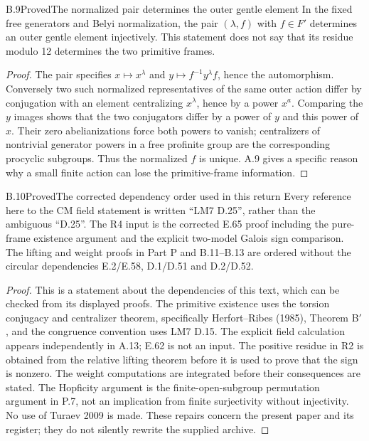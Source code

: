\begin{statement}{B.9}{Proved}{The normalized pair determines the outer gentle element}
In the fixed free generators and Belyi normalization,
the pair $(\lambda,f)$ with $f\in F'$ determines
an outer gentle element injectively. This statement
does not say that its residue modulo 12 determines
the two primitive frames.
\end{statement}
\begin{proof}
The pair specifies $x\mapsto x^\lambda$ and
$y\mapsto f^{-1}y^\lambda f$, hence the automorphism.
Conversely two such normalized representatives of
the same outer action differ by conjugation with
an element centralizing $x^\lambda$, hence by a
power $x^a$. Comparing the $y$ images shows that
the two conjugators differ by a power of $y$ and
this power of $x$. Their zero abelianizations
force both powers to vanish; centralizers of
nontrivial generator powers in a free profinite
group are the corresponding procyclic subgroups.
Thus the normalized $f$ is unique. A.9 gives a
specific reason why a small finite action can lose
the primitive-frame information.
\end{proof}

\begin{statement}{B.10}{Proved}{The corrected dependency order used in this return}
Every reference here to the CM field statement is
written ``LM7 D.25'', rather than the ambiguous
``D.25''. The R4 input is the corrected E.65 proof
including the pure-frame existence argument and
the explicit two-model Galois sign comparison.
The lifting and weight proofs in Part P and B.11--B.13
are ordered without the circular dependencies
E.2/E.58, D.1/D.51 and D.2/D.52.
\end{statement}
\begin{proof}
This is a statement about the dependencies of this
text, which can be checked from its displayed
proofs. The primitive existence uses the torsion
conjugacy and centralizer theorem, specifically
Herfort--Ribes (1985), Theorem B$'$, and the
congruence convention uses LM7 D.15. The explicit
field calculation appears independently in A.13;
E.62 is not an input. The positive residue in R2
is obtained from the relative lifting theorem
before it is used to prove that the sign is nonzero.
The weight computations are integrated before
their consequences are stated. The Hopficity
argument is the finite-open-subgroup permutation
argument in P.7, not an implication from finite
surjectivity without injectivity. No use of Turaev
2009 is made. These repairs concern the present
paper and its register; they do not silently
rewrite the supplied archive.
\end{proof}

